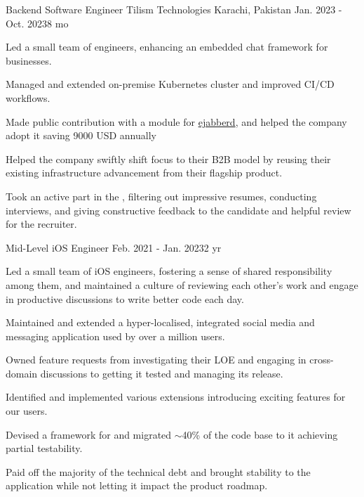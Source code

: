 \begin{cventries}
  \cventry
  {Backend Software Engineer} %
  {Tilism Technologies} %
  {Karachi, Pakistan} %
  {Jan. 2023 - Oct. 2023{\enskip\cdotp\enskip}8 mo} %
  {
    \begin{cvitems} %
      \item {Led a small team of engineers, enhancing an embedded chat framework for businesses.}
      \item {Managed and extended on-premise Kubernetes cluster and improved CI/CD workflows.}
      \item {Made public contribution with a module for \href{https://github.com/processone/ejabberd-contrib/pull/311}{\textcolor{awesome}{ejabberd}}, and helped the company adopt it saving 9000 USD annually}
      \item {Helped the company swiftly shift focus to their B2B model by reusing their existing infrastructure advancement from their flagship product.}
      \item {Took an active part in the , filtering out impressive resumes, conducting interviews, and giving constructive feedback to the candidate and helpful review for the recruiter.}
    \end{cvitems}
  }

  \cventry
  {Mid-Level iOS Engineer} %
  {} %
  {} %
  {Feb. 2021 - Jan. 2023{\enskip\cdotp\enskip}2 yr} %
  {
    \begin{cvitems} %
      \item {Led a small team of iOS engineers, fostering a sense of shared responsibility among them, and maintained a culture of reviewing each other's work and engage in productive discussions to write better code each day.}
      \item {Maintained and extended a hyper-localised, integrated social media and messaging application used by over a million users.}
      \item {Owned feature requests from investigating their LOE and engaging in cross-domain discussions to getting it tested and managing its release.}
      \item {Identified and implemented various  extensions introducing exciting features for our users.}
      \item {Devised a framework for  and migrated $\sim$40\% of the code base to it achieving partial testability.}
      \item {Paid off the majority of the technical debt and brought stability to the application while not letting it impact the product roadmap.}
    \end{cvitems}
  }


\end{cventries}
